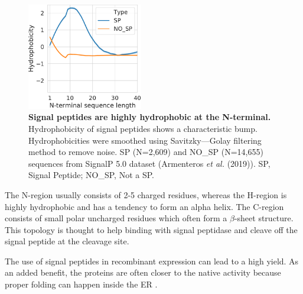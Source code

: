 \begin{figure}
  \begin{center}
    \includegraphics[width=0.45\textwidth]{chapters/Introduction/SignalPeptide/Figures/sp_nosp_lineplot.pdf}
    \caption[Signal peptides are highly hydrophobic at the N-terminal.]{\textbf{Signal peptides are highly hydrophobic at the N-terminal.} Hydrophobicity of signal peptides shows a characteristic bump. Hydrophobicities were smoothed using Savitzky—Golay filtering method to remove noise. SP (N=2,609) and NO\_SP (N=14,655) sequences from SignalP 5.0 dataset (Armenteros \textit{et al.} (2019)). SP, Signal Peptide; NO\_SP, Not a SP.}%
    \label{fig:signal_peptides}
  \end{center}
\end{figure}
The N-region usually consists of 2-5 charged residues, whereas the H-region is highly hydrophobic and has a tendency to form an alpha helix. The C-region consists of small polar uncharged residues which often form a $\beta$-sheet structure. This topology is thought to help binding with signal peptidase and cleave off the signal peptide at the cleavage site. 


The use of signal peptides in recombinant expression can lead to a high yield. As an added benefit, the proteins are often closer to the native activity because proper folding can happen inside the ER \cite{Futatsumori-Sugai2010-iu, Karyolaimos2019-ip}. 

